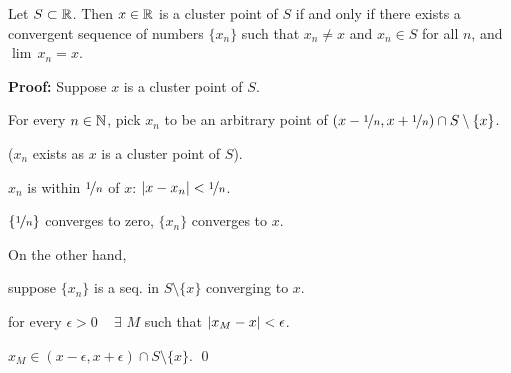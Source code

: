 \documentclass[10pt,aspectratio=149]{beamer}
\begin{document}
\begin{frame}

\begin{proposition}
Let $S \subset {\mathbb{R}}$.  Then $x \in {\mathbb{R}}$ is a cluster point of $S$
if and only if
there exists a convergent sequence of numbers $\{ x_n \}$ such that
$x_n \not= x$ and $x_n \in S$ for all $n$, and $\lim\, x_n = x$.
\end{proposition}

\pause
\textbf{Proof:}
Suppose $x$ is a cluster point of $S$.

\pause

For every $n \in {\mathbb{N}}$, pick $x_n$ to be an arbitrary point of
$(x-\nicefrac{1}{n},x+\nicefrac{1}{n}) \cap S \setminus \{x\}$.

($x_n$ exists as $x$ is a cluster point of $S$).

\pause

$x_n$ is within $\nicefrac{1}{n}$ of $x$: \quad
$\left\lvert {x-x_n} \right\rvert < \nicefrac{1}{n}$.


\pause

$\{ \nicefrac{1}{n} \}$ converges to zero, $\{ x_n \}$ converges to $x$.

\pause
\medskip

On the other hand, 

suppose $\{ x_n \}$ is a seq. in $S \setminus \{ x \}$ converging to $x$.

\pause
\thus \quad
for every $\epsilon > 0$ ~ $\exists$ $M$ such that $\left\lvert {x_M - x} \right\rvert < \epsilon$.

\pause
\thus \quad $x_M \in (x-\epsilon,x+\epsilon) \cap S \setminus \{x\}$.
\qed

\end{frame}
\end{document}
